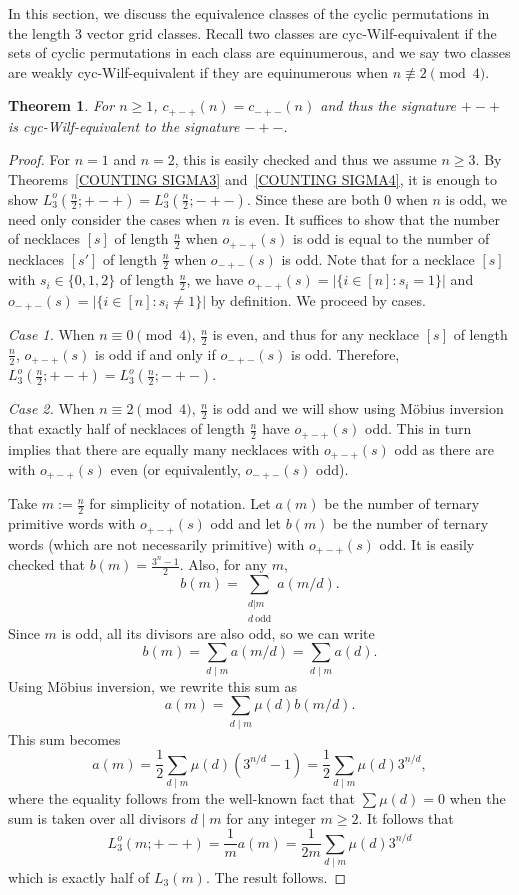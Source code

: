 \documentclass[12pt]{article}
\theoremstyle{plain}
\newtheorem{theorem}{Theorem}
\theoremstyle{definition}
\begin{document}
In this section, we discuss the equivalence classes of the cyclic permutations in the length 3 vector grid classes. Recall two classes are cyc-Wilf-equivalent if the sets of cyclic permutations in each class are equinumerous, and we say two classes are weakly cyc-Wilf-equivalent if they are equinumerous when $n\not\equiv 2 \!\pmod 4$.

\begin{theorem}\label{thm sigma3 equiv sigma4}
For $n \geq 1$, $c_{+-+}(n)= c_{-+-}(n)$ and thus the signature $+-+$ is cyc-Wilf-equivalent to the signature $-+-$. 
\end{theorem}

\begin{proof}
For $n=1$ and $n=2$, this is easily checked and thus we assume $n\geq 3$. By Theorems~\ref{COUNTING SIGMA3} and~\ref{COUNTING SIGMA4}, it is enough to show $L^o_3(\frac{n}{2};+-+)=L^o_3(\frac{n}{2};-+-)$. Since these are both 0 when $n$ is odd, we need only consider the cases when $n$ is even. It suffices to show that the number of necklaces $[s]$ of length $\frac{n}{2}$ when $o_{+-+}(s)$ is odd is equal to the number of necklaces $[s']$ of length $\frac{n}{2}$ when $o_{-+-}(s)$ is odd.
Note that for a necklace $[s]$ with $s_i \in \{0,1,2\}$ of length $\frac{n}{2}$, we have $o_{+-+}(s)=|\{i \in [n] : s_i =1\}|$ and $o_{-+-}(s)=|\{i \in [n] : s_i \neq1\}|$ by definition.   We proceed by cases.

\textit{Case 1.} When $n \equiv 0 \!\pmod 4$, $\frac n2$ is even, and thus for any necklace $[s]$ of length $\frac n2$, $o_{+-+}(s)$ is odd if and only if $o_{-+-}(s)$ is odd. Therefore, $L^o_3(\frac{n}{2};+-+)=L^o_3(\frac{n}{2};-+-)$.

\textit{Case 2.} When $n\equiv 2 \!\pmod 4$, $\frac n2$ is odd and we will show using M\"{o}bius inversion that exactly half of necklaces of length $\frac n2$ have $o_{+-+}(s)$ odd. This in turn implies that there are equally many necklaces with $o_{+-+}(s)$ odd as there are with $o_{+-+}(s)$ even (or equivalently, $o_{-+-}(s)$ odd). 

Take $m := \frac n2$ for simplicity of notation. Let $a(m)$ be the number of ternary primitive words with $o_{+-+}(s)$ odd and let $b(m)$ be the number of ternary words (which are not necessarily primitive) with $o_{+-+}(s)$ odd. It is easily checked that $b(m) = \frac{3^n-1}{2}$. Also, for any $m$, 
	$$b(m) = \sum_{\substack{d|m\\ d\ \mathrm{odd}}} a(m/d).$$
Since $m$ is odd, all its divisors are also odd, so we can write $$b(m) = \sum_{d\mid m} a(m/d)= \sum_{d\mid m} a(d).$$ Using M\"{o}bius inversion, we rewrite this sum as $$ a(m) = \sum_{d\mid m} \mu(d)b(m/d).$$ 
This sum becomes $$a(m) = \frac{1}{2} \sum_{d\mid m} \mu(d) (3^{n/d}-1) = \frac{1}{2} \sum_{d\mid m} \mu(d) 3^{n/d},$$ where the equality follows from the well-known fact that $\sum \mu(d) = 0$ when the sum is taken over all divisors $d\mid m$ for any integer $m\geq 2$. It follows that $$L^o_3(m;+-+) = \frac{1}{m}a(m) = \frac{1}{2m}\sum_{d\mid m} \mu(d) 3^{n/d}$$ which is exactly half of $L_3(m)$. The result follows.
\end{proof}
\end{document}
